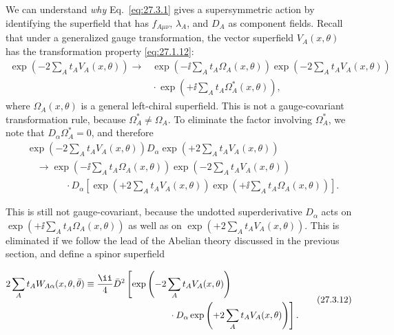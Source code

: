 We can understand \textit{why} Eq.~\eqref{eq:27.3.1} gives a
supersymmetric action by identifying the superfield that has
\(f_{A\mu\nu}\), \(\lambda_A\), and \(D_A\) as component fields. Recall
that under a generalized gauge transformation, the vector superfield
\(V_A(x,\theta)\) has the transformation property \eqref{eq:27.1.12}:
\begin{equation}
  \begin{aligned}
  \exp\left(-2\sum_A t_A V_A(x,\theta)\right)
  \longrightarrow{}&
  \exp\left(-\ii\sum_A t_A\Omega_A(x,\theta)\right)
  \exp\left(-2\sum_A t_A V_A(x,\theta)\right)
  \\
  &{}\cdot
  \exp\left(+\ii\sum_A t_A\Omega_A^*(x,\theta)\right),
  \end{aligned}
  \tag{27.3.10}\label{eq:27.3.10}
\end{equation}
where \(\Omega_A(x,\theta)\) is a general left-chiral superfield. This is
not a gauge-covariant transformation rule, because
\(\Omega_A^*\ne\Omega_A\). To eliminate the factor involving
\(\Omega_A^*\), we note that \(D_\alpha\Omega_A^*=0\), and therefore
\begin{equation}
  \begin{aligned}
  &\exp\left(-2\sum_A t_A V_A(x,\theta)\right)
  D_\alpha
  \exp\left(+2\sum_A t_A V_A(x,\theta)\right)
  \\
  &\quad\longrightarrow
  \exp\left(-\ii\sum_A t_A\Omega_A(x,\theta)\right)
  \exp\left(-2\sum_A t_A V_A(x,\theta)\right)
  \\
  &\qquad\qquad{}\cdot
  D_\alpha\left[
    \exp\left(+2\sum_A t_A V_A(x,\theta)\right)
    \exp\left(+\ii\sum_A t_A\Omega_A(x,\theta)\right)
  \right].
  \end{aligned}
  \tag{27.3.11}\label{eq:27.3.11}
\end{equation}
\begin{sloppypar}
This is still not gauge-covariant, because the undotted superderivative
\(D_\alpha\) acts on
\(\exp(+\ii\sum_A t_A\Omega_A(x,\theta))\) as well as on
\(\exp(+2\sum_A t_A V_A(x,\theta))\). This is eliminated if we follow
the lead of the Abelian theory discussed in the previous section, and
define a spinor superfield
\end{sloppypar}
\begin{equation}
  \begin{aligned}
  2\sum_A t_AW_{A\alpha}(x,\theta,\bar\theta)
  \equiv{}&
  \frac{\ii}{4}\bar D^2
  \left[
    \exp\left(-2\sum_A t_AV_A(x,\theta)\right)
  \right.
  \\
  &\left.\hspace{27mm}{}
    \cdot D_\alpha
    \exp\left(+2\sum_A t_AV_A(x,\theta)\right)
  \right].
  \end{aligned}
  \tag{27.3.12}\label{eq:27.3.12}
\end{equation}
